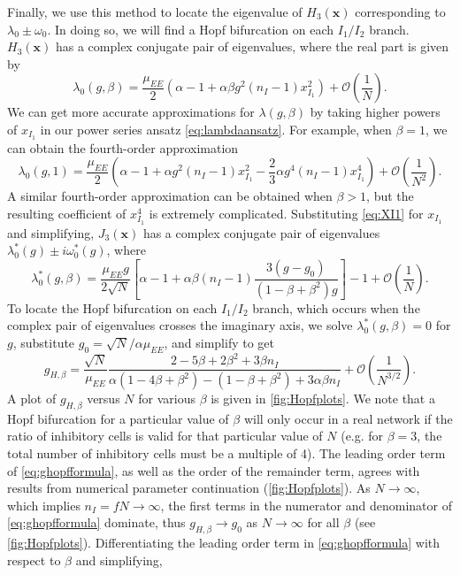 \documentclass[reqno]{siamonline190516}
\newcommand{\xvec}{\mathbf{x}}
\begin{document}
Finally, we use this method to locate the eigenvalue of $H_3(\xvec)$ corresponding to $\lambda_0 \pm \omega_0$. In doing so, we will find a Hopf bifurcation on each $I_1/I_2$ branch. $H_3(\xvec)$ has a complex conjugate pair of eigenvalues, where the real part is given by
\begin{equation}
\lambda_0(g, \beta) = \frac{\mu_{EE}}{2}\left( \alpha - 1 + \alpha \beta g^2 (n_I-1) x_{I_1}^2 \right) + \mathcal{O}\left(\frac{1}{N} \right).
\end{equation}
We can get more accurate approximations for $\lambda(g, \beta)$ by taking higher powers of $x_{I_1}$ in our power series ansatz \cref{eq:lambdaansatz}. For example, when $\beta=1$, we can obtain the fourth-order approximation
\[
\lambda_0(g, 1) = \frac{\mu_{EE}}{2}\left( \alpha - 1 + \alpha g^2 (n_I-1) x_{I_1}^2 - \frac{2}{3}\alpha g^4 (n_I-1) x_{I_1}^4 \right) + \mathcal{O}\left(\frac{1}{N^2} \right).
\]
A similar fourth-order approximation can be obtained when $\beta>1$, but the resulting coefficient of $x_{I_1}^4$ is extremely complicated.
Substituting \cref{eq:XI1} for $x_{I_1}$ and simplifying, $J_3(\xvec)$ has a complex conjugate pair of eigenvalues $\lambda_0^*(g) \pm i \omega_0^*(g)$, where
\begin{equation}\label{eq:lambdagbeta}
\lambda_0^*(g, \beta) = \frac{\mu_{EE} g}{2 \sqrt{N}}\left[ \alpha - 1 + \alpha \beta (n_I-1) \frac{ 3(g - g_0) }{ (1 - \beta + \beta^2 )g} \right] - 1 + \mathcal{O}\left(\frac{1}{N} \right).
\end{equation}
To locate the Hopf bifurcation on each $I_1/I_2$ branch, which occurs when the complex pair of eigenvalues crosses the imaginary axis, we solve $\lambda_0^*(g, \beta) = 0$ for $g$, substitute $g_0 = \sqrt{N}/\alpha \mu_{EE}$, and simplify to get
\begin{equation}\label{eq:ghopfformula}
    g_{H,\beta} = 
    \frac{\sqrt{N}}{\mu_{EE}} 
    \frac{ 2 - 5\beta + 2 \beta^2 + 3 \beta n_I}
    { \alpha(1 - 4 \beta + \beta^2) - (1 - \beta + \beta^2) + 3 \alpha \beta n_I }
    + \mathcal{O}\left( \frac{1}{N^{3/2}} \right).
\end{equation}
A plot of $g_{H,\beta}$ versus $N$ for various $\beta$ is given in \cref{fig:Hopfplots}. We note that a Hopf bifurcation for a particular value of $\beta$ will only occur in a real network if the ratio of inhibitory cells is valid for that particular value of $N$ (e.g. for $\beta = 3$, the total number of inhibitory cells must be a multiple of 4). The leading order term of \cref{eq:ghopfformula}, as well as the order of the remainder term, agrees with results from numerical parameter continuation (\cref{fig:Hopfplots}). As $N \rightarrow \infty$, which implies $n_I = f N \rightarrow \infty$, the first terms in the numerator and denominator of \cref{eq:ghopfformula} dominate, thus $g_{H,\beta} \rightarrow g_0$ as $N \rightarrow \infty$ for all $\beta$ (see \cref{fig:Hopfplots}). Differentiating the leading order term in \cref{eq:ghopfformula} with respect to $\beta$ and simplifying,
\end{document}
